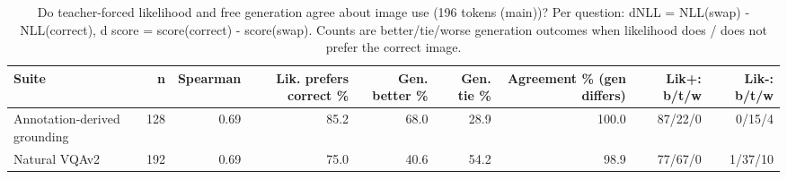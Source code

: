 \begin{table}[t]
\centering
\small
\caption{Do teacher-forced likelihood and free generation agree about image use (196 tokens (main))? Per question: dNLL = NLL(swap) - NLL(correct), d score = score(correct) - score(swap). Counts are better/tie/worse generation outcomes when likelihood does / does not prefer the correct image.}
\label{tab:t2_t7_likelihood_vs_generation_main}
\begin{tabular}{lrrrrrrrr}
\toprule
Suite & n & Spearman & Lik. prefers correct \% & Gen. better \% & Gen. tie \% & Agreement \% (gen differs) & Lik+: b/t/w & Lik-: b/t/w \\
\midrule
Annotation-derived grounding & 128 & 0.69 & 85.2 & 68.0 & 28.9 & 100.0 & 87/22/0 & 0/15/4 \\
Natural VQAv2 & 192 & 0.69 & 75.0 & 40.6 & 54.2 & 98.9 & 77/67/0 & 1/37/10 \\
\bottomrule
\end{tabular}
\end{table}
